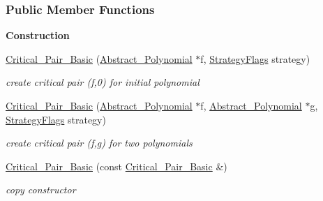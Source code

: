 \subsubsection*{Public Member Functions}
\begin{Indent}\textbf{ Construction}\par
\begin{DoxyCompactItemize}
\item 
\mbox{\label{group___g_b_computation_a54a4115589e1c46851167727b5d21578}} 
\hyperlink{group___g_b_computation_a54a4115589e1c46851167727b5d21578}{Critical\+\_\+\+Pair\+\_\+\+Basic} (\hyperlink{group__polygroup_class_abstract___polynomial}{Abstract\+\_\+\+Polynomial} $\ast$f, \hyperlink{group__strategygroup_ga0ee6c8e033547330e6b89929730007f4}{Strategy\+Flags} strategy)
\begin{DoxyCompactList}\small\item\em create critical pair (f,0) for initial polynomial \end{DoxyCompactList}\item 
\mbox{\label{group___g_b_computation_a393b8f7069c8e641a982ba4d704d349c}} 
\hyperlink{group___g_b_computation_a393b8f7069c8e641a982ba4d704d349c}{Critical\+\_\+\+Pair\+\_\+\+Basic} (\hyperlink{group__polygroup_class_abstract___polynomial}{Abstract\+\_\+\+Polynomial} $\ast$f, \hyperlink{group__polygroup_class_abstract___polynomial}{Abstract\+\_\+\+Polynomial} $\ast$g, \hyperlink{group__strategygroup_ga0ee6c8e033547330e6b89929730007f4}{Strategy\+Flags} strategy)
\begin{DoxyCompactList}\small\item\em create critical pair (f,g) for two polynomials \end{DoxyCompactList}\item 
\mbox{\label{group___g_b_computation_ac0feac9207d9b3a1575e0af88b5aa73e}} 
\hyperlink{group___g_b_computation_ac0feac9207d9b3a1575e0af88b5aa73e}{Critical\+\_\+\+Pair\+\_\+\+Basic} (const \hyperlink{group___g_b_computation_class_critical___pair___basic}{Critical\+\_\+\+Pair\+\_\+\+Basic} \&)
\begin{DoxyCompactList}\small\item\em copy constructor \end{DoxyCompactList}\end{DoxyCompactItemize}
\end{Indent}
